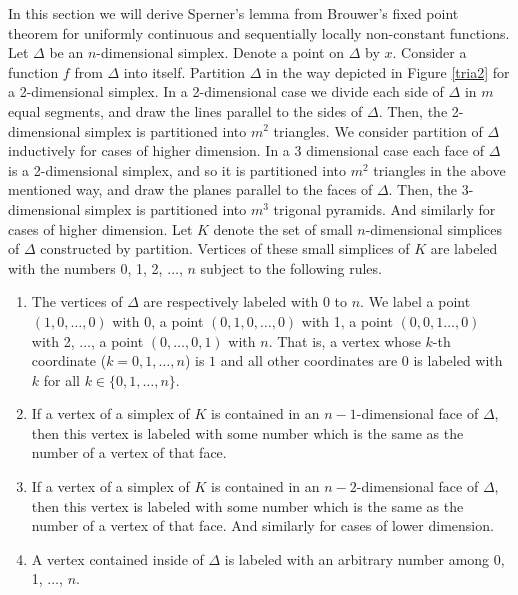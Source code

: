 \documentclass[reqno]{amsart}
\begin{document}
In this section we will derive Sperner's lemma from Brouwer's fixed point theorem for uniformly continuous and sequentially locally non-constant functions. Let $\Delta$ be an $n$-dimensional simplex. Denote a point on $\Delta$ by $x$. Consider a function $f$ from $\Delta$ into itself. Partition $\Delta$ in the way depicted in Figure \ref{tria2} for a 2-dimensional simplex. In a 2-dimensional case we divide each side of $\Delta$ in $m$ equal segments, and draw the lines parallel to the sides of $\Delta$. Then, the 2-dimensional simplex is partitioned into $m^2$ triangles. We consider partition of $\Delta$ inductively for cases of higher dimension. In a 3 dimensional case each face of $\Delta$ is a 2-dimensional simplex, and so it is partitioned into $m^2$ triangles in the above mentioned way, and draw the planes parallel to the faces of $\Delta$. Then, the 3-dimensional simplex is partitioned into $m^3$ trigonal pyramids. And similarly for cases of higher dimension. Let $K$ denote the set of small $n$-dimensional simplices of $\Delta$ constructed by partition. Vertices of these small simplices of $K$ are labeled with the numbers 0, 1, 2, $\dots$, $n$ subject to the following rules. 
\begin{enumerate}
\item The vertices of $\Delta$ are respectively labeled with 0 to $n$. We label a point $(1,0, \dots, 0)$ with 0, a point $(0,1,0, \dots, 0)$ with 1, a point $(0,0,1 \dots, 0)$ with 2, $\dots$, a point $(0,\dots, 0,1)$ with $n$. That is, a vertex whose $k$-th coordinate ($k=0, 1, \dots, n$) is $1$ and all other coordinates are 0 is labeled with $k$ for all $k\in \{0, 1, \dots, n\}$. 

\item If a vertex of a simplex of $K$ is contained in an $n-1$-dimensional face of $\Delta$, then this vertex is labeled with some number which is the same as the number of a vertex of that face.

\item If a vertex of a simplex of $K$ is contained in an $n-2$-dimensional face of $\Delta$, then this vertex is labeled with some number which is the same as the number of a vertex of that face. And similarly for cases of lower dimension.

\item A vertex contained inside of $\Delta$ is labeled with an arbitrary number among 0, 1, $\dots$, $n$.
\end{enumerate}
\end{document}
